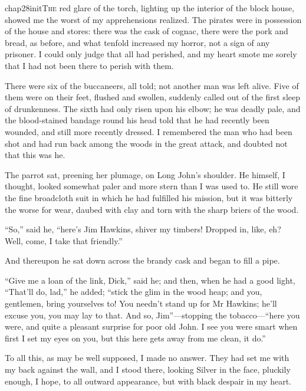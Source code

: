 
   \lettrine[lines=4,image=true]{chap28initT}{he} red glare of the torch, lighting up the interior of the block house, showed me the worst of my apprehensions realized. The pirates were in possession of the house and stores: there was the cask of cognac, there were the pork and bread, as before, and what tenfold increased my horror, not a sign of any prisoner. I could only judge that all had perished, and my heart smote me sorely that I had not been there to perish with them.

There were six of the buccaneers, all told; not another man was left alive. Five of them were on their feet, flushed and swollen, suddenly called out of the first sleep of drunkenness. The sixth had only risen upon his elbow; he was deadly pale, and the blood-stained bandage round his head told that he had recently been wounded, and still more recently dressed. I remembered the man who had been shot and had run back among the woods in the great attack, and doubted not that this was he.

The parrot sat, preening her plumage, on Long John’s shoulder. He himself, I thought, looked somewhat paler and more stern than I was used to. He still wore the fine broadcloth suit in which he had fulfilled his mission, but it was bitterly the worse for wear, daubed with clay and torn with the sharp briers of the wood.

\enquote{So,} said he, \enquote{here’s Jim Hawkins, shiver my timbers! Dropped in, like, eh? Well, come, I take that friendly.}

And thereupon he sat down across the brandy cask and began to fill a pipe.

\enquote{Give me a loan of the link, Dick,} said he; and then, when he had a good light, \enquote{That’ll do, lad,} he added; \enquote{stick the glim in the wood heap; and you, gentlemen, bring yourselves to! You needn’t stand up for Mr Hawkins; he’ll excuse you, you may lay to that. And so, Jim}---stopping the tobacco---\enquote{here you were, and quite a pleasant surprise for poor old John. I see you were smart when first I set my eyes on you, but this here gets away from me clean, it do.}

To all this, as may be well supposed, I made no answer. They had set me with my back against the wall, and I stood there, looking Silver in the face, pluckily enough, I hope, to all outward appearance, but with black despair in my heart.

